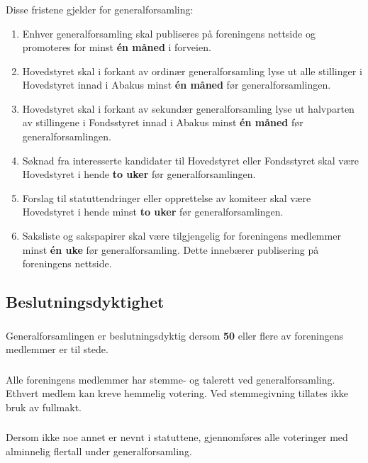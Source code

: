 \subsubsection{}
Disse fristene gjelder for generalforsamling:
\begin{enumerate}[label=\alph*)]
    \item Enhver generalforsamling skal publiseres på foreningens nettside og promoteres for minst \textbf{én måned} i forveien.
    \item Hovedstyret skal i forkant av ordinær generalforsamling lyse ut alle stillinger i Hovedstyret innad i Abakus minst
    \textbf{én måned} før generalforsamlingen.
    \item Hovedstyret skal i forkant av sekundær generalforsamling lyse ut halvparten av stillingene i Fondsstyret innad i Abakus
    minst \textbf{én måned} før generalforsamlingen.
    \item Søknad fra interesserte kandidater til Hovedstyret eller Fondsstyret skal være Hovedstyret
    i hende \textbf{to uker} før generalforsamlingen.
    \item Forslag til statuttendringer eller opprettelse av komiteer skal være Hovedstyret i
    hende minst \textbf{to uker} før generalforsamlingen.
    \item Saksliste og sakspapirer skal være tilgjengelig for foreningens medlemmer minst \textbf{én uke}
    før generalforsamling. Dette innebærer publisering på foreningens nettside.
\end{enumerate}

\subsection{Beslutningsdyktighet}
\subsubsection{}
Generalforsamlingen er beslutningsdyktig dersom \textbf{50} eller flere av foreningens medlemmer er til stede.

\subsubsection{}
Alle foreningens medlemmer har stemme- og talerett ved generalforsamling. Ethvert medlem kan kreve hemmelig votering.
Ved stemmegivning tillates ikke bruk av fullmakt.

\subsubsection{}
Dersom ikke noe annet er nevnt i statuttene, gjennomføres alle voteringer med alminnelig flertall under generalforsamling.

